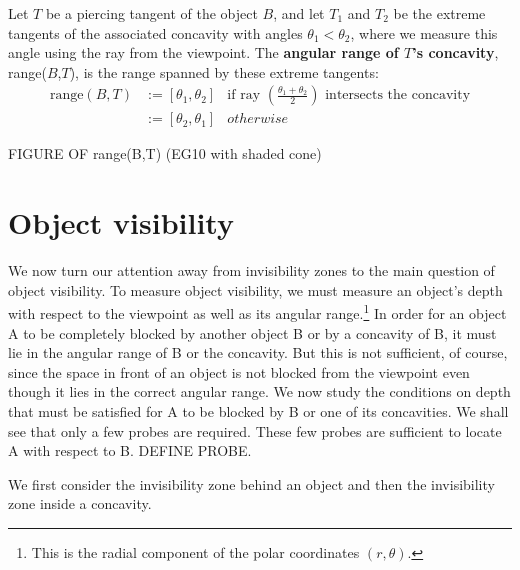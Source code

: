 \documentclass[12pt]{article}
\begin{document}
\begin{defn2}
Let $T$ be a piercing tangent of the object $B$,
and let $T_1$ and $T_2$ be the extreme tangents of the associated concavity
with angles $\theta_1 < \theta_2$,
where we measure this angle using the ray from the viewpoint.
The {\bf angular range of $T$'s concavity}, range($B$,$T$), 
is the range spanned by these extreme tangents:
\begin{eqnarray*}
\mbox{range}(B,T) & := [\theta_1,\theta_2] & \mbox{if ray } 
(\frac{\theta_1 + \theta_2}{2}) \mbox{ intersects the concavity} \\
              & := [\theta_2, \theta_1] & otherwise
\end{eqnarray*}
\end{defn2}

FIGURE OF range(B,T) (EG10 with shaded cone)


\section{Object visibility}
\label{sec:ov}


We now turn our attention away from invisibility zones
to the main question of object visibility.
To measure object visibility, we must measure an object's depth with respect
to the viewpoint as well as its angular range.\footnote{This is the radial component of the polar coordinates $(r,\theta)$.}
In order for an object A to be completely blocked by another object B 
or by a concavity of B, it must lie in the angular range of B or the concavity.
But this is not sufficient, of course,
since the space in front of an object is not blocked from the viewpoint
even though it lies in the correct angular range.
We now study the conditions on depth that must be satisfied for A to be blocked
by B or one of its concavities.
We shall see that only a few probes are required.
These few probes are sufficient to locate A with respect to B.
DEFINE PROBE.

We first consider the invisibility zone behind an object and then the invisibility zone
inside a concavity.
\end{document}
